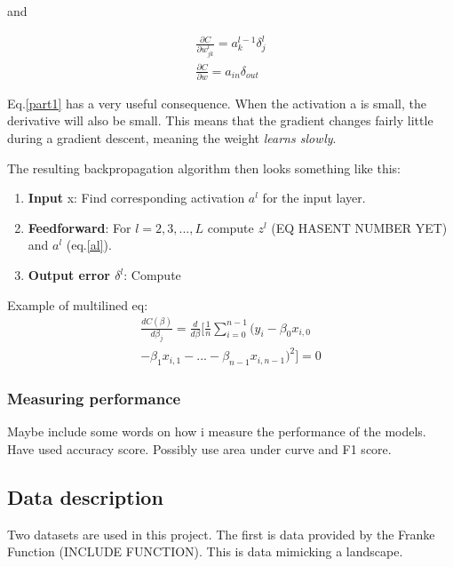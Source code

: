 \documentclass[a4paper,11pt,twocolumn]{article}
\begin{document}
and

\begin{equation*}
\begin{aligned}
\frac{\partial C}{\partial w_{jk}^l} = a_k^{l-1}\delta_j^l \\
\frac{\partial C}{\partial w} = a_{in}\delta_{out}
\end{aligned}
\label{part1}
\end{equation*}

Eq.\eqref{part1} has a very useful consequence. When the activation a is small, the derivative will also be small. This means that the gradient changes fairly little during a gradient descent, meaning the weight \textit{learns slowly}. 

The resulting backpropagation algorithm then looks something like this:
\begin{enumerate}
\item \textbf{Input} x: Find corresponding activation $a^l$ for the input layer.
\item \textbf{Feedforward}: For $l = 2,3,...,L$ compute $z^l$ (EQ HASENT NUMBER YET) and $a^l$ (eq.\eqref{al}).
\item \textbf{Output error $\delta^l$}: Compute  
\end{enumerate}

\cite{Nielsen}



Example of multilined eq:
\begin{equation}
\begin{multlined}
\frac{dC(\beta)}{d\beta_j}= \frac{d}{d\beta}[\frac{1}{n}\sum\limits_{i=0}^{n-1}(y_i-\beta_0x_{i,0}\\-\beta_1x_{i,1}-...-\beta_{n-1}x_{i,n-1})^2] = 0
\end{multlined}
\end{equation}

\subsubsection{Measuring performance}

Maybe include some words on how i measure the performance of the models. Have used accuracy score. Possibly use area under curve and F1 score. 

\subsection{Data description}
Two datasets are used in this project. The first is data provided by the Franke Function (INCLUDE FUNCTION). This is data mimicking a landscape. 
\end{document}
